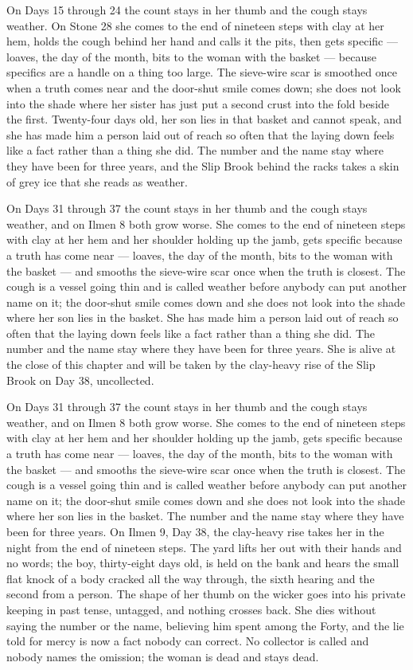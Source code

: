 \documentclass{design/chronicle}
\begin{document}
{On Days 15 through 24 the count stays in her thumb and the cough stays weather. On Stone 28 she comes to the end of nineteen steps with clay at her hem, holds the cough behind her hand and calls it the pits, then gets specific --- loaves, the day of the month, bits to the woman with the basket --- because specifics are a handle on a thing too large. The sieve-wire scar is smoothed once when a truth comes near and the door-shut smile comes down; she does not look into the shade where her sister has just put a second crust into the fold beside the first. Twenty-four days old, her son lies in that basket and cannot speak, and she has made him a person laid out of reach so often that the laying down feels like a fact rather than a thing she did. The number and the name stay where they have been for three years, and the Slip Brook behind the racks takes a skin of grey ice that she reads as weather.

On Days 31 through 37 the count stays in her thumb and the cough stays weather, and on Ilmen 8 both grow worse. She comes to the end of nineteen steps with clay at her hem and her shoulder holding up the jamb, gets specific because a truth has come near --- loaves, the day of the month, bits to the woman with the basket --- and smooths the sieve-wire scar once when the truth is closest. The cough is a vessel going thin and is called weather before anybody can put another name on it; the door-shut smile comes down and she does not look into the shade where her son lies in the basket. She has made him a person laid out of reach so often that the laying down feels like a fact rather than a thing she did. The number and the name stay where they have been for three years. She is alive at the close of this chapter and will be taken by the clay-heavy rise of the Slip Brook on Day 38, uncollected.

On Days 31 through 37 the count stays in her thumb and the cough stays weather, and on Ilmen 8 both grow worse. She comes to the end of nineteen steps with clay at her hem and her shoulder holding up the jamb, gets specific because a truth has come near --- loaves, the day of the month, bits to the woman with the basket --- and smooths the sieve-wire scar once when the truth is closest. The cough is a vessel going thin and is called weather before anybody can put another name on it; the door-shut smile comes down and she does not look into the shade where her son lies in the basket. The number and the name stay where they have been for three years. On Ilmen 9, Day 38, the clay-heavy rise takes her in the night from the end of nineteen steps. The yard lifts her out with their hands and no words; the boy, thirty-eight days old, is held on the bank and hears the small flat knock of a body cracked all the way through, the sixth hearing and the second from a person. The shape of her thumb on the wicker goes into his private keeping in past tense, untagged, and nothing crosses back. She dies without saying the number or the name, believing him spent among the Forty, and the lie told for mercy is now a fact nobody can correct. No collector is called and nobody names the omission; the woman is dead and stays dead.

}
\end{document}
